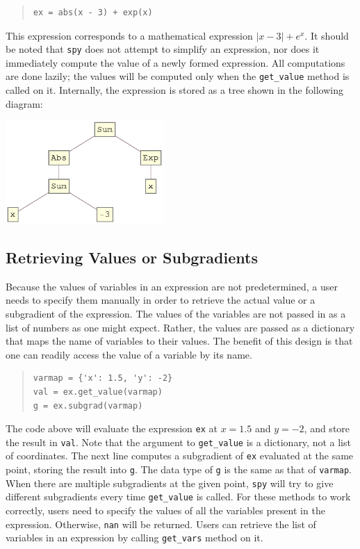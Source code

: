 \documentclass[12pt]{article}
\begin{document}
\begin{quote}
\begin{verbatim}
ex = abs(x - 3) + exp(x)
\end{verbatim}
\end{quote}

\noindent This expression corresponds to a mathematical expression
$|x-3|+e^x$. It should be noted that \verb'spy' does not attempt to
simplify an expression, nor does it immediately compute the value of
a newly formed expression. All computations are done lazily; the
values will be computed only when the \verb'get_value' method is called on
it. Internally, the expression is stored as a tree shown in the following diagram:

\begin{center}
\includegraphics[width=0.45\textwidth]{expr}
\end{center}

\subsection{Retrieving Values or Subgradients}
Because the values of variables in an expression are not predetermined, a user needs to specify them manually in order to retrieve the actual value or a subgradient of the expression. The values of the variables are not passed in as a list of numbers as one might expect. Rather, the values are passed as a dictionary that maps the name of variables to their values. The benefit of this design is that one can readily access the value of a variable by its name.

\begin{quote}
\begin{verbatim}
varmap = {'x': 1.5, 'y': -2}
val = ex.get_value(varmap)
g = ex.subgrad(varmap)
\end{verbatim}
\end{quote}

\noindent The code above will evaluate the expression \verb'ex' at $x=1.5$ and $y=-2$, and store the result in \verb'val'. Note that the argument to \verb'get_value' is a dictionary, not a list of coordinates. The next line computes a subgradient of \verb'ex' evaluated at the same point, storing the result into \verb'g'. The data type of \verb'g' is the same as that of \verb'varmap'. When there are multiple subgradients at the given point, \verb'spy' will try to give different subgradients every time \verb'get_value' is called. For these methods to work correctly, users need to specify the values of all the variables present in the expression. Otherwise, \verb'nan' will be returned. Users can retrieve the list of variables in an expression by calling \verb'get_vars' method on it.
\end{document}
